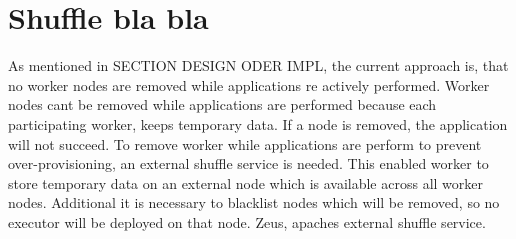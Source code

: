 \section{Shuffle bla bla}
As mentioned in SECTION DESIGN ODER IMPL, the current approach is, that no worker nodes are removed while applications re actively performed.
Worker nodes cant be removed while applications are performed because each participating worker, keeps temporary data. If a node is removed, the application will not succeed.
%
To remove worker while applications are perform to prevent over-provisioning, an external shuffle service is needed. This enabled worker to store temporary data on an external node which is available across all worker nodes.
Additional it is necessary to blacklist nodes which will be removed, so no executor will be deployed on that node.
%
Zeus, apaches external shuffle service.
